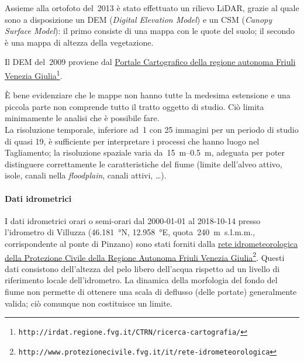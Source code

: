Assieme alla ortofoto del~2013 è stato effettuato un rilievo LiDAR, grazie al quale sono a disposizione un DEM (\emph{Digital Elevation Model}) e un CSM (\emph{Canopy Surface Model}): il primo consiste di una mappa con le quote del suolo; il secondo è una mappa di altezza della vegetazione.

Il DEM del~2009 proviene dal \href{http://irdat.regione.fvg.it/CTRN/ricerca-cartografia/}{Portale Cartografico della regione autonoma Friuli Venezia Giulia}\footnote{\texttt{http://irdat.regione.fvg.it/CTRN/ricerca-cartografia/}}.

È bene evidenziare che le mappe non hanno tutte la medesima estensione e una piccola parte non comprende tutto il tratto oggetto di studio.
Ciò limita minimamente le analisi che è possibile fare.
\\
La risoluzione temporale, inferiore ad~\SI{1}{\anno} con \num{25} immagini per un periodo di studio di quasi \SI{19}{\anni}, è sufficiente per interpretare i processi che hanno luogo nel Tagliamento; la risoluzione spaziale varia da~\SIrange[range-phrase={ a }]{15}{0.5}{\m}, adeguata per poter distinguere correttamente le caratteristiche del fiume (limite dell'alveo attivo, isole, canali nella \emph{floodplain}, canali attivi, \ldots).

\paragraph{Dati idrometrici}
I dati idrometrici orari o semi-orari dal 2000-01-01 al 2018-10-14 presso l'idrometro di Villuzza (\SI{46.181}{\degree}N, \SI{12.958}{\degree}E, quota~\SI{240}{\m}~s.l.m.m., corrispondente al ponte di Pinzano) sono stati forniti dalla \href{http://www.protezionecivile.fvg.it/it/rete-idrometeorologica}{rete idrometeorologica della Protezione Civile della Regione Autonoma Friuli Venezia Giulia}\footnote{\texttt{http://www.protezionecivile.fvg.it/it/rete-idrometeorologica}}.
Questi dati consistono dell'altezza del pelo libero dell'acqua rispetto ad un livello di riferimento locale dell'idrometro.
La dinamica della morfologia del fondo del fiume non permette di ottenere una scala di deflusso (delle portate) generalmente valida; ciò comunque non costituisce un limite.

